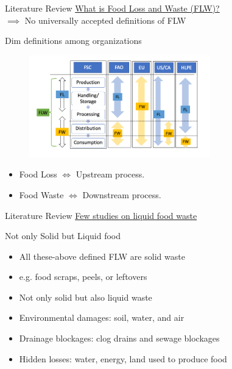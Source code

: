 \documentclass{beamer}
\begin{document}
\begin{frame}{Literature Review}
  \underline{What is Food Loss and Waste (FLW)?}\\
  $\implies$ No universally accepted definitions of FLW
     \begin{block}{Dim definitions among organizations}
        \begin{figure}
            \centering
            \includegraphics[width=0.7\textwidth,height=0.7\textheight,keepaspectratio]{defnFLW.png}
        \end{figure}
     \end{block}
     \begin{itemize}
        \item Food Loss  $\Longleftrightarrow$ Upstream process.
        \item Food Waste $\Longleftrightarrow$ Downstream process.
    \end{itemize}  
\end{frame}


\begin{frame}{Literature Review}
    \underline{Few studies on liquid food waste}
    
    \begin{block}{Not only Solid but Liquid food}       
        \begin{itemize}
            \item All these-above defined FLW are solid waste
            \item e.g. food scraps, peels, or leftovers
            \item Not only solid but also liquid waste
            \item Environmental damages: soil, water, and air
            \item Drainage blockages: clog drains and sewage blockages
            \item Hidden losses: water, energy, land used to produce food
        \end{itemize}
    \end{block}
\end{frame}
\end{document}
